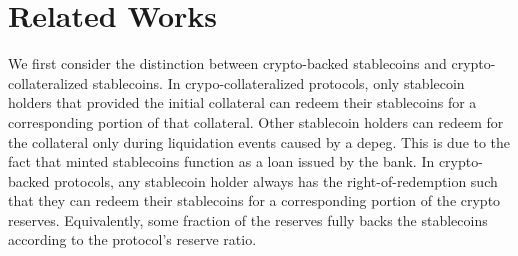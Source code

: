\documentclass{ifcolog}
\newcommand{\stc}{stablecoin}
\newcommand{\dx}{Dexy}
\begin{document}





\section{Related Works}
\label{sec:related-works}
We first consider the distinction between crypto-backed stablecoins and crypto-collateralized stablecoins.
In crypo-collateralized protocols, only stablecoin holders that provided the initial collateral can redeem their stablecoins for 
a corresponding portion of that collateral. Other stablecoin holders can redeem for the collateral only during 
liquidation events caused by a depeg. This is due to the fact that minted stablecoins function as a loan issued by the bank. 
In crypto-backed protocols, any stablecoin holder always has the right-of-redemption such that they can redeem
their stablecoins for a corresponding portion of the crypto reserves. Equivalently, some fraction of the reserves 
fully backs the stablecoins according to the protocol's reserve ratio.
\end{document}
